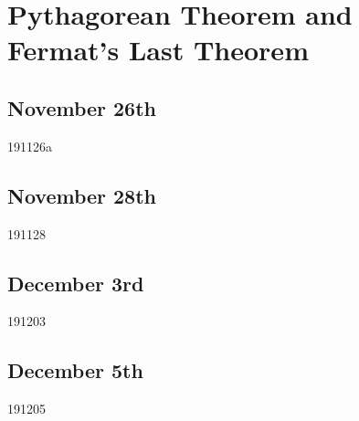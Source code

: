 \section{Pythagorean Theorem and Fermat's Last Theorem}
\subsection{November 26th}
{191126a}

\subsection{November 28th}
{191128}

\subsection{December 3rd}
{191203}

\subsection{December 5th}
{191205}


